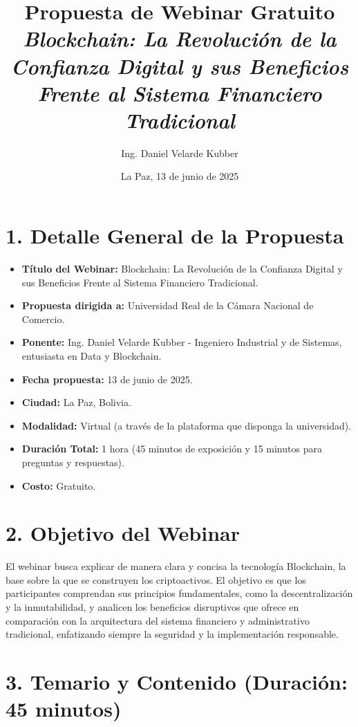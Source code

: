 \documentclass[12pt,a4paper]{article}
\title{
    \vspace{2cm}
    \textbf{Propuesta de Webinar Gratuito} \\
    \large \textit{Blockchain: La Revolución de la Confianza Digital y sus Beneficios Frente al Sistema Financiero Tradicional}
    \vspace{1.5cm}
}
\author{Ing. Daniel Velarde Kubber}
\date{La Paz, 13 de junio de 2025}
\begin{document}
\maketitle
\thispagestyle{empty}
\clearpage

\section*{1. Detalle General de la Propuesta}

\begin{itemize}
    \item \textbf{Título del Webinar:} Blockchain: La Revolución de la Confianza Digital y sus Beneficios Frente al Sistema Financiero Tradicional.
    \item \textbf{Propuesta dirigida a:} Universidad Real de la Cámara Nacional de Comercio.
    \item \textbf{Ponente:} Ing. Daniel Velarde Kubber - Ingeniero Industrial y de Sistemas, entusiasta en Data y Blockchain.
    \item \textbf{Fecha propuesta:} 13 de junio de 2025.
    \item \textbf{Ciudad:} La Paz, Bolivia.
    \item \textbf{Modalidad:} Virtual (a través de la plataforma que disponga la universidad).
    \item \textbf{Duración Total:} 1 hora (45 minutos de exposición y 15 minutos para preguntas y respuestas).
    \item \textbf{Costo:} Gratuito.
\end{itemize}

\section*{2. Objetivo del Webinar}

El webinar busca explicar de manera clara y concisa la tecnología Blockchain, la base sobre la que se construyen los criptoactivos. El objetivo es que los participantes comprendan sus principios fundamentales, como la descentralización y la inmutabilidad, y analicen los beneficios disruptivos que ofrece en comparación con la arquitectura del sistema financiero y administrativo tradicional, enfatizando siempre la seguridad y la implementación responsable.

\section*{3. Temario y Contenido (Duración: 45 minutos)}
\end{document}
